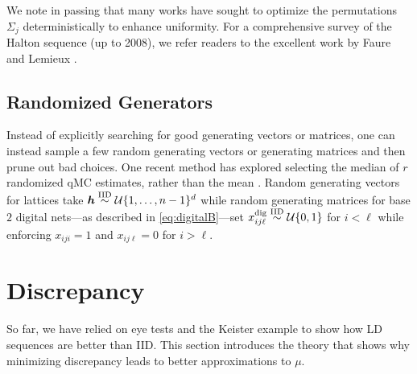 \documentclass{svproc}
\begin{document}
We note in passing that many works \cite{MasChiWar05,tuffin98,Atan04,vancools06} have sought to optimize the permutations $\Sigma_j$ deterministically to enhance uniformity. For a comprehensive survey of the Halton sequence (up to 2008), we refer readers to the excellent work by Faure and Lemieux \cite{faulem09}.




\subsection{Randomized Generators}

Instead of explicitly searching for good generating vectors or matrices, one can instead sample a few random generating vectors or generating matrices and then prune out bad choices. One recent method has explored selecting the median of $r$ randomized qMC estimates, rather than the mean \cite{PanOwe23a}.  Random generating vectors for lattices take ${\boldsymbol{h}} \overset{\text{IID}}{\sim} {\mathcal{U}}\{1,\dots,n-1\}^d$ while random generating matrices for base $2$ digital nets---as described in \eqref{eq:digitalB}---set $x^{\text{dig}}_{ij\ell} \overset{\text{IID}}{\sim} {\mathcal{U}}\{0,1\}$ for $i<\ell$ while enforcing $x_{iji}=1$ and $x_{ij\ell}=0$ for $i>\ell$. 

\section{Discrepancy} \label{sec:discrepancy}
So far, we have relied on eye tests and the Keister example to show how LD sequences are better than IID.  This section introduces the theory that shows why minimizing discrepancy leads to better approximations to $\mu$.
\end{document}
